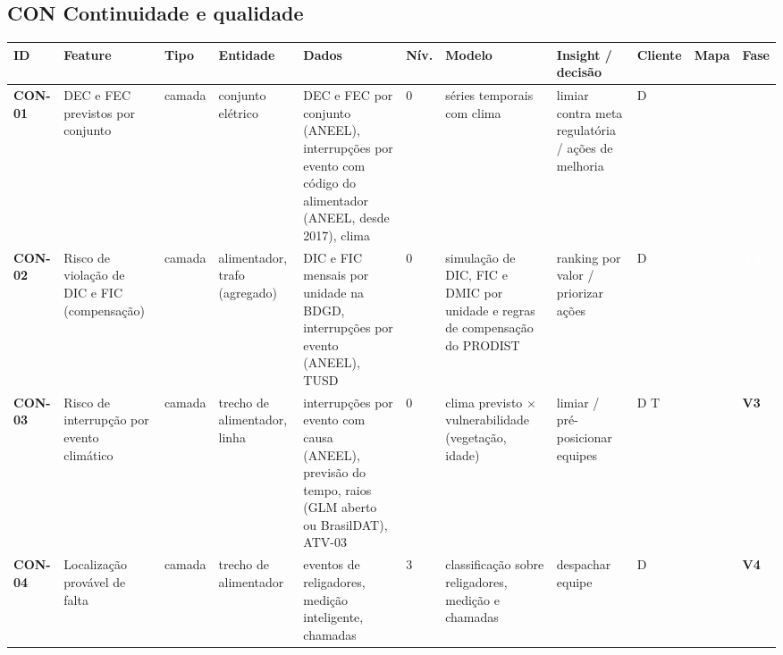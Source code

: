 \subsection*{CON \textperiodcentered{} Continuidade e qualidade}
\label{cat:CON}
{\footnotesize\setlength{\tabcolsep}{3pt}
\begin{longtable}{@{}P{1.35cm}P{4.1cm}P{1.3cm}P{3.1cm}P{3.7cm}C{0.6cm}P{3.6cm}P{3.3cm}P{1.1cm}P{0.9cm}P{1.1cm}@{}}
\toprule
\textbf{ID} & \textbf{Feature} & \textbf{Tipo} & \textbf{Entidade} & \textbf{Dados} & \textbf{Nív.} & \textbf{Modelo} & \textbf{Insight / decisão} & \textbf{Cliente} & \textbf{Mapa} & \textbf{Fase} \\
\midrule\endhead
\textbf{CON-01} & DEC e FEC previstos por conjunto & camada & conjunto elétrico & DEC e FEC por conjunto (ANEEL), interrupções por evento com código do alimentador (ANEEL, desde 2017), clima & 0 & séries temporais com clima & limiar contra meta regulatória / ações de melhoria & D &  & \colorbox{fV2}{\scriptsize \textcolor{white}{\textbf{V2}}} \\
\textbf{CON-02} & Risco de violação de DIC e FIC (compensação) & camada & alimentador, trafo (agregado) & DIC e FIC mensais por unidade na BDGD, interrupções por evento (ANEEL), TUSD & 0 & simulação de DIC, FIC e DMIC por unidade e regras de compensação do PRODIST & ranking por valor / priorizar ações & D &  & \colorbox{fV2}{\scriptsize \textcolor{white}{\textbf{V2}}} \\
\textbf{CON-03} & Risco de interrupção por evento climático & camada & trecho de alimentador, linha & interrupções por evento com causa (ANEEL), previsão do tempo, raios (GLM aberto ou BrasilDAT), ATV-03 & 0 & clima previsto $\times$ vulnerabilidade (vegetação, idade) & limiar / pré-posicionar equipes & D T &  & \colorbox{fV3}{\scriptsize \textbf{V3}} \\
\textbf{CON-04} & Localização provável de falta & camada & trecho de alimentador & eventos de religadores, medição inteligente, chamadas & 3 & classificação sobre religadores, medição e chamadas & despachar equipe & D &  & \colorbox{fV4}{\scriptsize \textbf{V4}} \\
\bottomrule
\end{longtable}}

